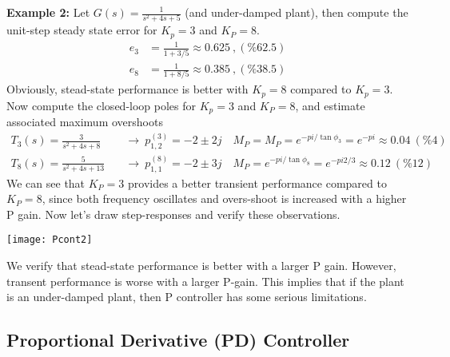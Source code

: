 \documentclass[twoside]{article}
\begin{document}
\textbf{Example 2:} Let $G(s) = \frac{1}{s^2 + 4 s + 5}$ (and under-damped
plant), then compute the unit-step steady state error for $K_p = 3$ and $K_P = 8$.
%
\begin{align*}
  e_{3} &= \frac{1}{1 + 3 / 5} \approx 0.625 \ , (\%62.5) 
\\
  e_{8} &= \frac{1}{1 + 8 / 5} \approx 0.385 \ , (\%38.5) 
\end{align*}
%
Obviously, stead-state performance is better with $K_p = 8$
compared to $K_p = 3$. Now compute the closed-loop poles
for $K_p = 3$ and $K_P = 8$, and estimate associated 
maximum overshoots
%
\begin{align*}
  T_3(s) = \frac{3}{s^2 + 4 s + 8} &\quad \rightarrow \
  p^{(3)}_{1,2} = -2 \pm 2 j  \quad M_P =M_P = e^{-pi / \tan \phi_3} =
                                     e^{-pi} \approx 0.04 \ (\%4)
\\
  T_8(s) = \frac{5}{s^2 + 4 s + 13} &\quad \rightarrow \
  p^{(8)}_{1,1} = -2 \pm 3 j  \quad M_P = e^{-pi / \tan \phi_8} =
                                      e^{-pi 2 / 3} \approx 0.12  \ (\%12)
\end{align*}
%
We can see that $K_P = 3$ provides a better transient performance
compared to $K_P = 8$, since both frequency oscillates and overs-shoot
is increased with a higher P gain. Now let's draw step-responses and
verify these observations. 

\vspace{12 pt}

  \begin{minipage}[h]{1\linewidth}
    \begin{center}
      \texttt{[image: Pcont2]}
    \end{center}
  \end{minipage}

\vspace{12 pt}

We verify that stead-state performance is better with a larger
P gain. However, transent performance is worse with a
larger P-gain. This implies that if the plant is an under-damped
plant, then P controller has some serious limitations. 


\subsection{Proportional Derivative (PD) Controller}
\end{document}
